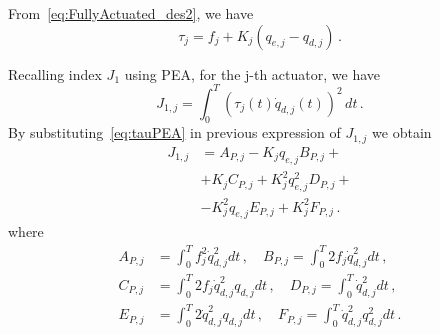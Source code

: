


From~\eqref{eq:FullyActuated_des2}, we have
\begin{equation}
\tau_j = f_j + K_j(q_{e,j} - q_{d,j})\, .
\label{eq:tauPEA}
\end{equation}

Recalling index $J_1$ using PEA, for the j-th actuator, we have
\begin{equation*}
J_{1,j}=\int_0^T (\tau_j(t)\dot q_{d,j}(t))^2\,dt\,.
\end{equation*}
By substituting~\eqref{eq:tauPEA} in previous expression of $J_{1,j}$ we obtain
\begin{align*}
J_{1,j} &= A_{P,j} - K_j q_{e,j} B_{P,j} + \nonumber\\
&+ K_j C_{P,j} +K_j^2 q^2_{e,j} D_{P,j} +\nonumber\\ &- K_j^2 q_{e,j} E_{P,j} + K_j^2 F_{P,j} \, . 
\end{align*}
where
\[
\begin{aligned}
A_{P,j} &= \int_0^T{f_j^2 \dot{q}^2_{d,j} dt}\,,\quad B_{P,j} = \int_0^T{2f_j \dot{q}^2_{d,j} dt}\,,\\
C_{P,j} &= \int_0^T{2f_j \dot{q}^2_{d,j} q_{d,j} dt}\,,\quad D_{P,j} = \int_0^T{\dot{q}^2_{d,j} dt}\,,\\
E_{P,j} &= \int_0^T{2 \dot{q}^2_{d,j} q_{d,j} dt}\,,\quad F_{P,j} = \int_0^T{\dot{q}^2_{d,j} q^2_{d,j} dt}\,.
\end{aligned}
\]

